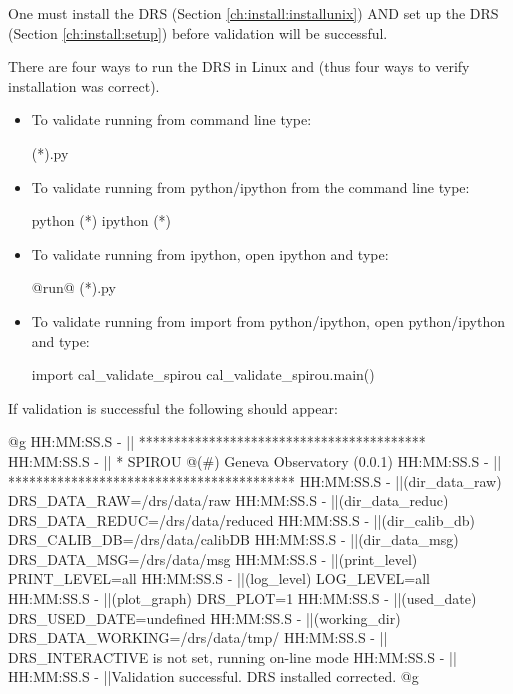 \begin{note}
One must install the DRS (Section \ref{ch:install:installunix}) AND set up the DRS (Section \ref{ch:install:setup}) before validation will be successful.
\end{note}

\noindent There are four ways to run the DRS in Linux and \mac (thus four ways to verify installation was correct).

\begin{itemize}

\item To validate running from command line type:
\begin{cmdbox}
(*\calvalidate*).py
\end{cmdbox}

\item To validate running from python/ipython from the command line type:
\begin{cmdbox}
python (*\calvalidate*)
ipython (*\calvalidate*)
\end{cmdbox}

\item To validate running from ipython, open ipython and type:
\begin{pythonbox}
@run@ (*\calvalidate*).py
\end{pythonbox}

\item To validate running from import from python/ipython, open python/ipython and type:
\begin{pythonbox}
import cal_validate_spirou
cal_validate_spirou.main()
\end{pythonbox}

\end{itemize}

\noindent If validation is successful the following should appear:

\begin{cmdboxprintspecial}
@g
HH:MM:SS.S -   || *****************************************
HH:MM:SS.S -   || * SPIROU @(#) Geneva Observatory (0.0.1)
HH:MM:SS.S -   || *****************************************
HH:MM:SS.S -   ||(dir_data_raw)      DRS_DATA_RAW=/drs/data/raw
HH:MM:SS.S -   ||(dir_data_reduc)    DRS_DATA_REDUC=/drs/data/reduced
HH:MM:SS.S -   ||(dir_calib_db)      DRS_CALIB_DB=/drs/data/calibDB
HH:MM:SS.S -   ||(dir_data_msg)      DRS_DATA_MSG=/drs/data/msg
HH:MM:SS.S -   ||(print_level)       PRINT_LEVEL=all         %
HH:MM:SS.S -   ||(log_level)         LOG_LEVEL=all         %
HH:MM:SS.S -   ||(plot_graph)        DRS_PLOT=1            %
HH:MM:SS.S -   ||(used_date)         DRS_USED_DATE=undefined
HH:MM:SS.S -   ||(working_dir)       DRS_DATA_WORKING=/drs/data/tmp/
HH:MM:SS.S -   ||                    DRS_INTERACTIVE is not set, running on-line mode
HH:MM:SS.S -   ||
HH:MM:SS.S -   ||Validation successful. DRS installed corrected.
@g
\end{cmdboxprintspecial}




